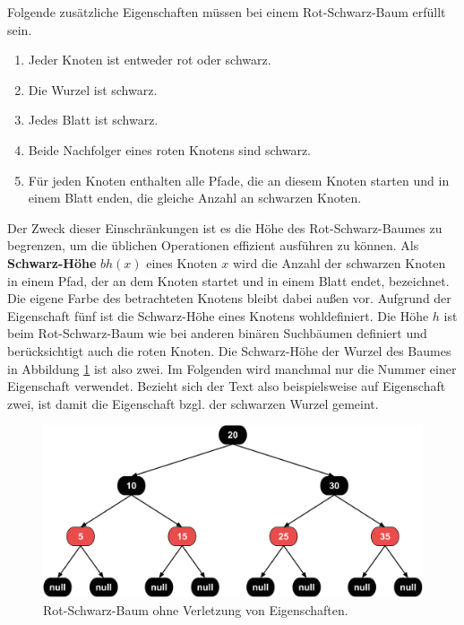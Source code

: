 \documentclass[a4paper,12pt]{article}
\begin{document}
\noindent Folgende zusätzliche Eigenschaften müssen bei einem Rot-Schwarz-Baum erfüllt sein. 

\begin{enumerate}
	\item Jeder Knoten ist entweder rot oder schwarz.
	\item Die Wurzel ist schwarz.
	\item Jedes Blatt ist schwarz.
	\item Beide Nachfolger eines roten Knotens sind schwarz.
	\item Für jeden Knoten enthalten alle Pfade, die an diesem Knoten starten und in einem Blatt enden, die gleiche Anzahl an schwarzen Knoten. 
\end{enumerate}  

\noindent  Der Zweck dieser Einschränkungen ist es die Höhe des Rot-Schwarz-Baumes zu begrenzen, um die üblichen Operationen effizient ausführen zu können. Als \textbf{Schwarz-Höhe} $\mathit{bh(x)}$ eines Knoten $x$ wird die Anzahl der schwarzen Knoten in einem Pfad, der an dem Knoten startet und in einem Blatt endet, bezeichnet. Die eigene Farbe des betrachteten Knotens bleibt dabei außen vor. Aufgrund der Eigenschaft fünf ist die Schwarz-Höhe eines Knotens wohldefiniert. Die Höhe $h$ ist beim Rot-Schwarz-Baum wie bei anderen binären Suchbäumen definiert und berücksichtigt auch die roten Knoten. Die Schwarz-Höhe der Wurzel des Baumes in Abbildung \ref{fig:IOBaum} ist also zwei. Im Folgenden wird manchmal nur die Nummer einer Eigenschaft verwendet. Bezieht sich der Text also beispielsweise auf Eigenschaft zwei, ist damit die Eigenschaft bzgl. der schwarzen Wurzel gemeint.
\\
\begin{figure}[h]
	\centering
	\includegraphics[width= 1\textwidth]{"Medien/RotSchwarzBaum/IOBaum"}
	\caption{Rot-Schwarz-Baum ohne Verletzung von Eigenschaften. }
	\label{fig:IOBaum}
\end{figure}
\end{document}
